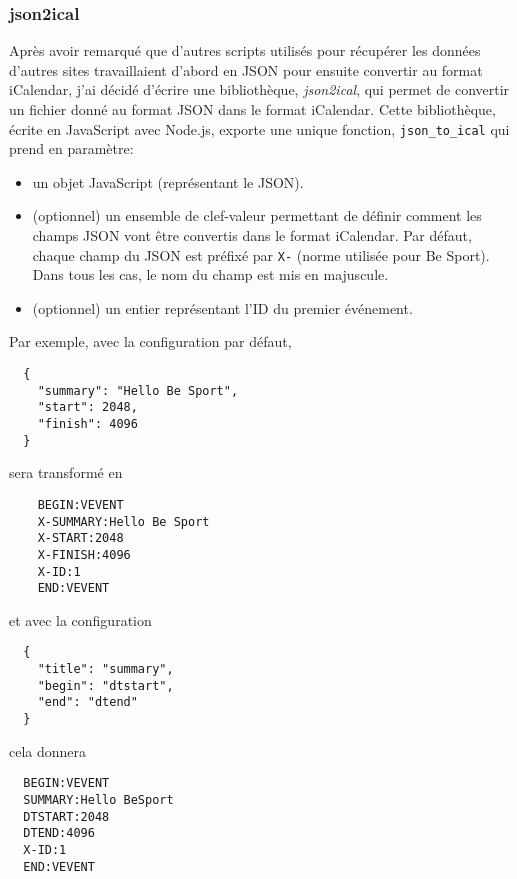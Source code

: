\subsubsection*{json2ical}

Après avoir remarqué que d'autres scripts utilisés pour récupérer les données
d'autres sites travaillaient d'abord en JSON pour ensuite convertir au format
iCalendar, j'ai décidé d'écrire une bibliothèque, \emph{json2ical}, qui permet
de convertir un fichier donné au format JSON dans le format iCalendar.
Cette bibliothèque, écrite en JavaScript avec Node.js, exporte une unique
fonction, \verb|json_to_ical| qui prend en paramètre:

\begin{itemize}
  \item un objet JavaScript (représentant le JSON).
  \item (optionnel) un ensemble de clef-valeur permettant de définir comment les champs JSON
    vont être convertis dans le format iCalendar. Par défaut, chaque champ du
    JSON est préfixé par \verb|X-| (norme utilisée pour Be Sport). Dans tous les
    cas, le nom du champ est mis en majuscule.
  \item (optionnel) un entier représentant l'ID du premier événement.
\end{itemize}

Par exemple, avec la configuration par défaut,

\begin{lstlisting}
  {
    "summary": "Hello Be Sport",
    "start": 2048,
    "finish": 4096
  }
\end{lstlisting}

sera transformé en

\begin{lstlisting}
    BEGIN:VEVENT
    X-SUMMARY:Hello Be Sport
    X-START:2048
    X-FINISH:4096
    X-ID:1
    END:VEVENT
\end{lstlisting}

et avec la configuration

\begin{lstlisting}
  {
    "title": "summary",
    "begin": "dtstart",
    "end": "dtend"
  }
\end{lstlisting}

cela donnera

\begin{lstlisting}
  BEGIN:VEVENT
  SUMMARY:Hello BeSport
  DTSTART:2048
  DTEND:4096
  X-ID:1
  END:VEVENT
\end{lstlisting}

